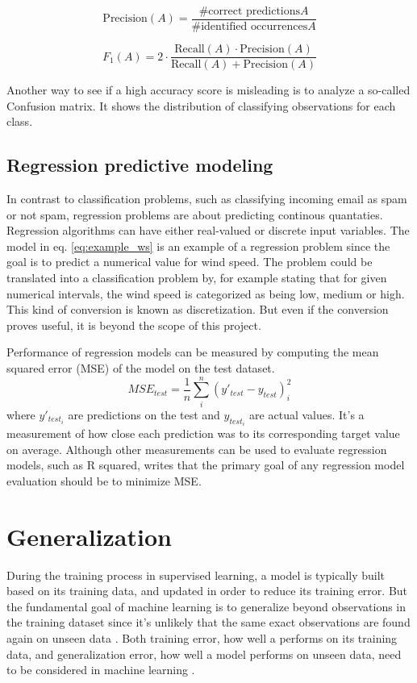 \begin{equation} \label{eq:precision}
	\mbox{Precision}(A) = \frac{\mbox{\#correct predictions} A}{\mbox{\#identified occurrences} A}
\end{equation}

\begin{equation} \label{eq:f1}
	F_1(A) = 2 \cdot \frac{\mbox{Recall}(A) \cdot \mbox{Precision}(A)}{\mbox{Recall}(A) + \mbox{Precision}(A)}
\end{equation}

Another way to see if a high accuracy score is misleading is to analyze a so-called Confusion matrix. It shows the distribution of classifying observations for each class.


	\subsection{Regression predictive modeling} \label{sec:regression}
	In contrast to classification problems, such as classifying incoming email as spam or not spam, regression problems are about predicting continous quantaties. Regression algorithms can have either real-valued or discrete input variables. The model in eq. \ref{eq:example_ws} is an example of a regression problem since the goal is to predict a numerical value for wind speed. The problem could be translated into a classification problem by, for example stating that for given numerical intervals, the wind speed is categorized as being low, medium or high. This kind of conversion is known as discretization. But even if the conversion proves useful, it is beyond the scope of this project. 

	Performance of regression models can be measured by computing the mean squared error (MSE) of the model on the test dataset. 
\begin{equation}
	MSE_{test} = \frac{1}{n} \sum_{i}^{n}(y'_{test} - y_{test})_{i}^2
\end{equation}
where $y'_{test_i}$ are predictions on the test and $y_{test_i}$ are actual values. It's a measurement of how close each prediction was to its corresponding target value on average. Although other measurements can be used to evaluate regression models, such as R squared, \cite{BOOK:13} writes that the primary goal of any regression model evaluation should be to minimize MSE.


\section{Generalization} \label{sec:generalization}
	During the training process in supervised learning, a model is typically built based on its training data, and updated in order to reduce its training error. But the fundamental goal of machine learning is to generalize beyond observations in the training dataset since it's unlikely that the same exact observations are found again on unseen data \cite{ARTICLE:3}. Both training error, how well a performs on its training data, and generalization error, how well a model performs on unseen data, need to be considered in machine learning \cite{BOOK:1}.

